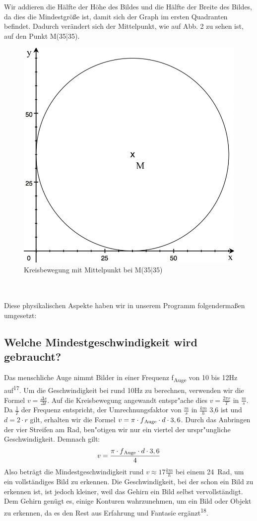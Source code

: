 \documentclass [a4paper, 11pt] {article}
\begin{document}
Wir addieren die Hälfte der Höhe des Bildes und die Hälfte der Breite des Bildes, da dies die Mindestgröße ist, damit sich der Graph im ersten Quadranten befindet. Dadurch verändert sich der Mittelpunkt, wie auf Abb. 2 zu sehen ist, auf den Punkt M(35\big|35).
\begin{figure}[h]
	\centering
	\includegraphics[width=12cm]{dia2.png}
	\caption{Kreisbewegung mit Mittelpunkt bei M(35\big|35)}
\end{figure}\\
\\Diese physikalischen Aspekte haben wir in unserem Programm folgendermaßen umgesetzt:
\subsection{Welche Mindestgeschwindigkeit wird gebraucht?}
Das menschliche Auge nimmt Bilder in einer Frequenz f\textsubscript{Auge} von 10 bis 12Hz auf\textsuperscript{17}. Um die Geschwindigkeit bei rund 10Hz zu berechnen, verwenden wir die Formel $v = \frac{\Delta s}{\Delta t}$. Auf die Kreisbewegung angewandt entspr"ache dies $v = \frac{2\pi r}{T}$ in $\frac{m}{s}$. Da $\frac{1}{T}$ der Frequenz entspricht, der Umrechnungsfaktor von $\frac{m}{s}$ in $\frac{km}{h}$ 3,6 ist und $d = 2 \cdot r$ gilt, erhalten wir die Formel $v = \pi \cdot f\textsubscript{Auge} \cdot d \cdot 3,6$. Durch das Anbringen der vier Streifen am Rad, ben"otigen wir nur ein viertel der urspr"ungliche Geschwindigkeit. Demnach gilt: 
\begin{align}
v = \frac{\pi \cdot f\textsubscript{Auge} \cdot d \cdot 3,6}{4}
\end{align}
Also beträgt die Mindestgeschwindigkeit rund $v \approx 17\frac{km}{h}$ bei einem 24\grqq\ Rad, um ein vollständiges Bild zu erkennen. Die Geschwindigkeit, bei der schon ein Bild zu erkennen ist, ist jedoch kleiner, weil das Gehirn ein Bild selbst vervollständigt. Dem Gehirn genügt es, einige Konturen wahrzunehmen, um ein Bild oder Objekt zu erkennen, da es den Rest aus Erfahrung und Fantasie ergänzt\textsuperscript{18}.
\end{document}
